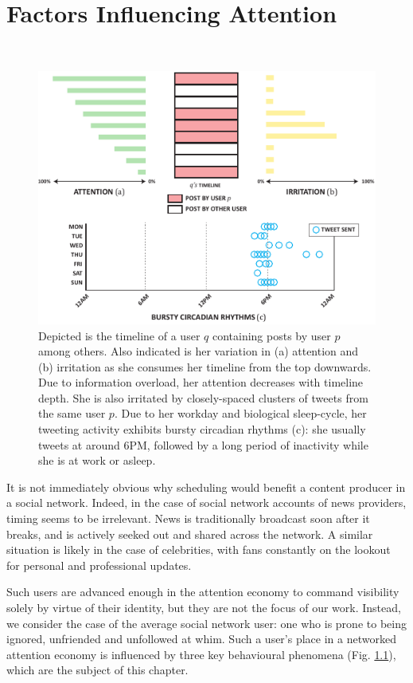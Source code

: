 \documentclass[onesided,letterpaper]{tufte-book}
\begin{document}
\chapter{Factors Influencing Attention}
\label{ch:factors}
\\[-1pc]
\begin{figure}%
  \includegraphics[width=\linewidth]{phenomena}
  \caption[Factors influencing attention.]{Depicted is the timeline of a user $q$ containing posts by user $p$ among others. Also indicated is her variation in (a) attention and (b) irritation as she consumes her timeline from the top downwards. Due to information overload, her attention decreases with timeline depth. She is also irritated by closely-spaced clusters of tweets from the same user $p$. Due to her workday and biological sleep-cycle, her tweeting activity exhibits bursty circadian rhythms (c): she usually tweets at around 6PM, followed by a long period of inactivity while she is at work or asleep.}
  \label{fig:phenomena}
\end{figure}

It is not immediately obvious why scheduling would benefit a content producer in a social network. Indeed, in the case of social network accounts of news providers, timing seems to be irrelevant. News is traditionally broadcast soon after it breaks, and is actively seeked out and shared across the network. A similar situation is likely in the case of celebrities, with fans constantly on the lookout for personal and professional updates.

Such users are advanced enough in the attention economy to command visibility solely by virtue of their identity, but they are not the focus of our work. Instead, we consider the case of the average social network user: one who is prone to being ignored, unfriended and unfollowed at whim. Such a user's place in a networked attention economy is influenced by three key behavioural phenomena (Fig. \ref{fig:phenomena}), which are the subject of this chapter.
\end{document}
